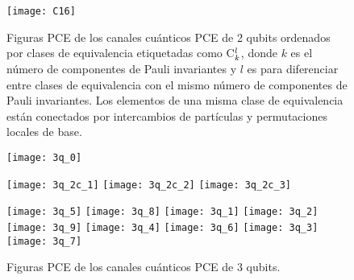 \begin{figure}[H]
	\begin{minipage}[b]{0.49\textwidth}
	\centering
		\texttt{[image: C16]}
	\end{minipage}
	\caption{Figuras PCE de los canales cuánticos PCE de 2 qubits ordenados por 
	clases de equivalencia etiquetadas como C${}_{k}^{l}$, donde $k$ es el número 
	de componentes de Pauli invariantes y $l$ es para diferenciar entre clases 
	de equivalencia con el mismo número de componentes de Pauli invariantes.
	Los elementos de una misma clase de equivalencia están conectados por 
	intercambios de partículas y permutaciones locales de base. \ep}
	\label{fig:2qubits_PCEChannels_figs}
\end{figure} 
\begin{figure}[H]
	\centering
	\begin{minipage}[t]{.9\textwidth}
		\centering
		\texttt{[image: 3q\_0]}
		\vspace{-.5cm} 
		\vspace{-.5cm}
	\end{minipage}
	\begin{minipage}[t]{.9\textwidth}
		\centering
		\texttt{[image: 3q\_2c\_1]} \hfill
		\texttt{[image: 3q\_2c\_2]} \hfill
		\texttt{[image: 3q\_2c\_3]}
		\vspace{-.5cm} 
		 \vspace{-.5cm}
	\end{minipage}
	\begin{minipage}[t]{.9\textwidth}
		\centering
		\texttt{[image: 3q\_5]} \hfill
		\texttt{[image: 3q\_8]} \hfill
		\texttt{[image: 3q\_1]} \hfill 
		\texttt{[image: 3q\_2]} \hfill
		\texttt{[image: 3q\_9]} \hfill
		\texttt{[image: 3q\_4]} \hfill 
		\texttt{[image: 3q\_6]} \hfill
		\texttt{[image: 3q\_3]} \hfill
		\texttt{[image: 3q\_7]} 
		\vspace{-.5cm} 
	\end{minipage}
	\caption{Figuras PCE de los canales cuánticos PCE de 3 qubits. \ep}
	\label{fig:3qubits_PCEChannels_figs}
\end{figure}

